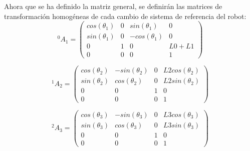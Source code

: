 	Ahora que se ha definido la matriz general, se definirán las matrices de transformación homogéneas de cada cambio de sistema de referencia del robot: \\

	\[ {^0}A_{1} =
	\left( \begin{array}{cccc}
	cos(\theta_{1}) &  0 &  sin(\theta_{1}) & 0  \\
	sin(\theta_{1}) &  0 & -cos(\theta_{1}) & 0  \\
	0		&  1 &		 0 			& L0+L1 \\
	0		&  0 & 		 0			& 1
	\end{array} \right) \]

	\[ {^1}A_{2} =
	\left( \begin{array}{cccc}
	cos(\theta_{2}) & -sin(\theta_{2}) & 0 & L2cos(\theta_{2}) \\
	sin(\theta_{2}) & cos(\theta_{2})  & 0 & L2sin(\theta_{2})  \\
	0 		 	   & 			0 			& 1	& 		0 			 \\
	0		 	   &			 0			& 0	& 		1
	\end{array} \right) \]

	\[ {^2}A_{3} =
	\left( \begin{array}{cccc}
	cos(\theta_{3}) &  -sin(\theta_{3}) &  0 & L3cos(\theta_{3})   \\
	sin(\theta_{3}) &  cos(\theta_{3}) &  0 & L3sin(\theta_{3})   \\
	0 					 &  0 &  				1 					  & 0 \\
	0 					 &  0 & 				 0					  & 1
	\end{array} \right) \]

